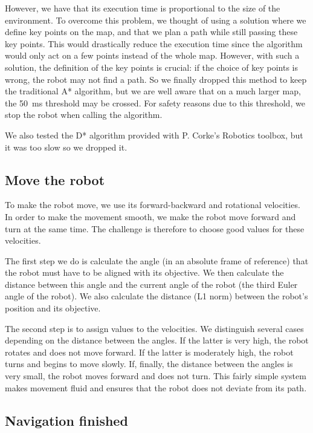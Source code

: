 \documentclass[a4paper, 10pt, conference]{ieeeconf}
\begin{document}
    However, we have that its execution time is proportional to the size of the environment. To overcome this problem, we thought of using a solution where we define key points on the map, and that we plan a path while still passing these key points. This would drastically reduce the execution time since the algorithm would only act on a few points instead of the whole map. However, with such a solution, the definition of the key points is crucial: if the choice of key points is wrong, the robot may not find a path. So we finally dropped this method to keep the traditional A* algorithm, but we are well aware that on a much larger map, the \SI{50}{\milli\second} threshold may be crossed. For safety reasons due to this threshold, we stop the robot when calling the algorithm.
    
    We also tested the D* algorithm provided with P. Corke's Robotics toolbox, but it was too slow so we dropped it.
    
    \subsection{Move the robot}
    
    To make the robot move, we use its forward-backward and rotational velocities. In order to make the movement smooth, we make the robot move forward and turn at the same time. The challenge is therefore to choose good values for these velocities.
    
    The first step we do is calculate the angle (in an absolute frame of reference) that the robot must have to be aligned with its objective. We then calculate the distance between this angle and the current angle of the robot (the third Euler angle of the robot). We also calculate the distance (L1 norm) between the robot's position and its objective.
    
    The second step is to assign values to the velocities. We distinguish several cases depending on the distance between the angles. If the latter is very high, the robot rotates and does not move forward. If the latter is moderately high, the robot turns and begins to move slowly. If, finally, the distance between the angles is very small, the robot moves forward and does not turn. This fairly simple system makes movement fluid and ensures that the robot does not deviate from its path.
    
    \subsection{Navigation finished}
    
\end{document}
